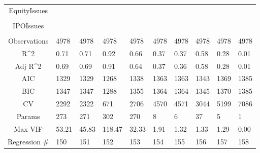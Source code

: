 \documentclass{article}
\begin{document}
\begin{table}[H]
\begin{tabular}{|clllllllll|}
  EquityIssues &  &  &  &  &  &  &  &  &  \\ 
   &  &  &  &  &  &  &  &  &  \\ 
  IPOIssues &  &  &  &  &  &  &  &  &  \\ 
   &  &  &  &  &  &  &  &  &  \\ 
  \hline 
 Observations & 4978 & 4978 & 4978 & 4978 & 4978 & 4978 & 4978 & 4978 & 4978 \\ 
  R^2 & 0.71 & 0.71 & 0.92 & 0.66 & 0.37 & 0.37 & 0.58 & 0.28 & 0.01 \\ 
  Adj R^2 & 0.69 & 0.69 & 0.91 & 0.64 & 0.37 & 0.36 & 0.58 & 0.28 & 0.01 \\ 
  AIC & 1329 & 1329 & 1268 & 1338 & 1363 & 1363 & 1343 & 1369 & 1385 \\ 
  BIC & 1347 & 1347 & 1288 & 1355 & 1364 & 1364 & 1345 & 1370 & 1385 \\ 
  CV & 2292 & 2322 & 671 & 2706 & 4570 & 4571 & 3044 & 5199 & 7086 \\ 
  Params & 273 & 271 & 302 & 270 & 8 & 6 & 37 & 5 & 1 \\ 
  Max VIF & 53.21 & 45.83 & 118.47 & 32.33 & 1.91 & 1.32 & 1.33 & 1.29 & 0.00 \\ 
  Regression \# & 150 & 151 & 152 & 153 & 154 & 155 & 156 & 157 & 158 \\ 
   \hline
\end{tabular}
 
\end{table}
\end{document}
